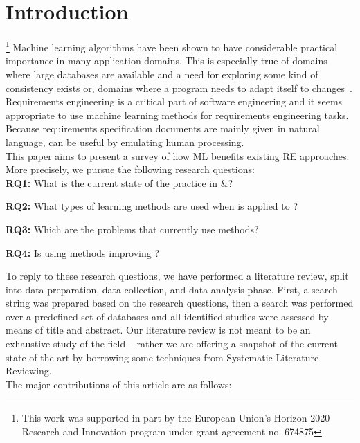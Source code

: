 \section{Introduction}

% 
% 
% 
% 
\footnote{This work was supported in part by the European Union’s Horizon 2020
Research and Innovation program under grant agreement no. 674875}
Machine learning algorithms have been shown to have considerable practical
importance in many application domains. This is especially true of domains where
large databases are available and a need for exploring some kind of consistency
exists or, domains where a program needs to adapt itself to
changes~\cite{Zhang2002}. Requirements engineering is a critical part of
software engineering and it seems appropriate to use machine learning methods
for requirements engineering tasks. Because requirements specification documents
are mainly given in natural language, \ML can be useful by emulating human
processing.
\\
This paper aims to present a survey of how ML benefits existing RE
approaches. More precisely, we pursue the following research questions: \\
\noindent
\textbf{RQ1:} What is the current state of the practice in \ML${\&}$\RE?

\noindent
\textbf{RQ2:} What types of learning methods are used when \ML is applied to
\RE?

\noindent
\textbf{RQ3:} Which are the \RE problems that currently use \ML methods?

\noindent
\textbf{RQ4:} Is using \ML methods improving \RE?

To reply to these research questions, we have performed a literature review,
split into data preparation, data collection, and data analysis phase. First, a search string
was prepared based on the research questions, then a search was performed over a
predefined set of databases and all identified studies were assessed by means of
title and abstract. Our literature review is not meant to be an exhaustive study
of the field -- rather we are offering a snapshot of the current
state-of-the-art by borrowing some techniques from Systematic Literature
Reviewing.\\
The major contributions of this article are as follows:

